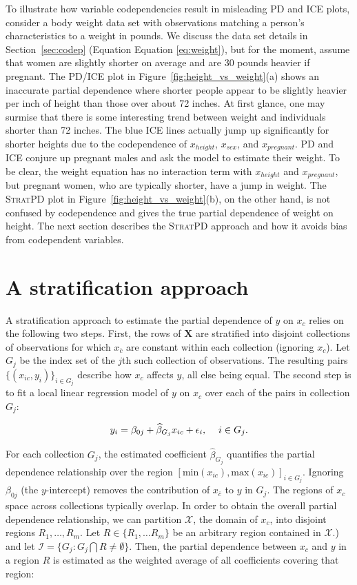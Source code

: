 \documentclass[12pt]{article}
\newcommand{\secref}[1]{Section~\ref{#1}}
\newcommand{\figref}[1]{Figure~\ref{#1}}
\newcommand{\spd}{\fontfamily{cmr}\textsc{\small StratPD}}
\newcommand{\xnc}{$x_{\overline{c}}$}
\begin{document}
To illustrate how variable codependencies result in misleading PD and ICE plots, consider a body weight data set with observations matching a person's characteristics to a weight in pounds. We discuss the data set details in \secref{sec:codep} (Equation Equation \eqref{eq:weight}), but for the moment, assume that women are slightly shorter on average and are 30 pounds heavier if pregnant. The PD/ICE plot in \figref{fig:height_vs_weight}(a) shows an inaccurate partial dependence where shorter people appear to be slightly heavier per inch of height than those over about 72 inches. At first glance, one may surmise that there is some interesting trend between weight and individuals shorter than 72 inches. The blue ICE lines actually jump up significantly for shorter heights due to the codependence of $x_{height}$, $x_{sex}$, and $x_{pregnant}$. PD and ICE conjure up pregnant males and ask the model to estimate their weight. To be clear, the weight equation has no interaction term with $x_{height}$ and $x_{pregnant}$, but pregnant women, who are typically shorter, have a jump in weight. The \spd{} plot in \figref{fig:height_vs_weight}(b), on the other hand, is not confused by codependence and gives the true partial dependence of weight on height.   The next section describes the \spd{} approach and how it avoids bias from codependent variables.

\section{A stratification approach}

A stratification approach to estimate the partial dependence of $y$ on $x_c$ relies on the following two steps. First, the rows of $\mathbf{X}$ are stratified into disjoint collections of observations for which \xnc{} are constant within each collection (ignoring $x_c$). Let $G_j$ be the index set of the $j$th such collection of observations. The resulting pairs $\{(x_{ic},  y_i)\}_{i \in G_j}$ describe how $x_c$ affects $y$, all else being equal. The second step is to fit a local linear regression model of $y$ on $x_c$ over each of the pairs in collection $G_j$:

$$y_i = \beta_{0j} + \widehat{\beta}_{G_j} x_{ic} + \epsilon_i, \hskip 1pc i \in G_j.$$

For each collection $G_j$, the estimated coefficient $\widehat{\beta}_{G_j}$ quantifies the partial dependence relationship over the region $[\text{min}(x_{ic}), \text{max}(x_{ic})]_{i \in G_j}$. Ignoring $\beta_{0j}$ (the $y$-intercept) removes the contribution of \xnc{} to $y$ in $G_j$. The regions of $x_c$ space across collections typically overlap.  In order to obtain the overall partial dependence relationship, we can partition $\mathcal{X}$, the domain of $x_c$, into disjoint regions $R_1, \ldots, R_m$. Let $R \in \{R_1, \ldots R_m\}$ be an arbitrary region contained in $\mathcal{X}.$) and let $\mathcal{I} = \{G_j: G_j \bigcap R \neq \emptyset\}$. Then, the partial dependence between $x_c$ and $y$ in a region $R$ is estimated as the weighted average of all coefficients covering that region: 
\end{document}
